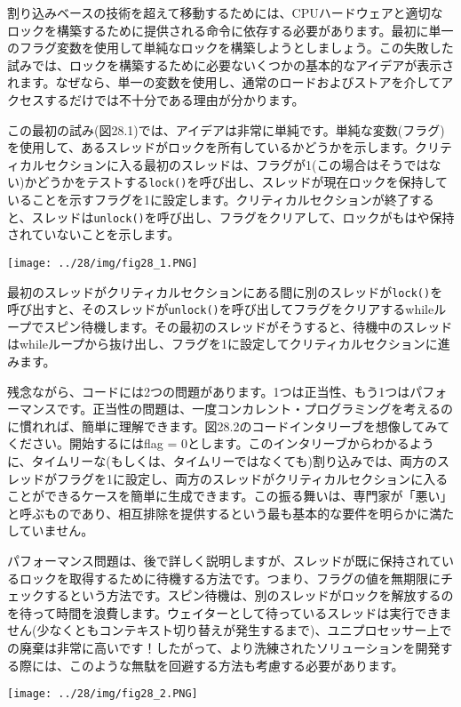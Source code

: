 割り込みベースの技術を超えて移動するためには、CPUハードウェアと適切なロックを構築するために提供される命令に依存する必要があります。最初に単一のフラグ変数を使用して単純なロックを構築しようとしましょう。この失敗した試みでは、ロックを構築するために必要ないくつかの基本的なアイデアが表示されます。なぜなら、単一の変数を使用し、通常のロードおよびストアを介してアクセスするだけでは不十分である理由が分かります。

この最初の試み(図28.1)では、アイデアは非常に単純です。単純な変数(フラグ)を使用して、あるスレッドがロックを所有しているかどうかを示します。クリティカルセクションに入る最初のスレッドは、フラグが1(この場合はそうではない)かどうかをテストする\texttt{lock()}を呼び出し、スレッドが現在ロックを保持していることを示すフラグを1に設定します。クリティカルセクションが終了すると、スレッドは\texttt{unlock()}を呼び出し、フラグをクリアして、ロックがもはや保持されていないことを示します。

\texttt{[image: ../28/img/fig28\_1.PNG]}

最初のスレッドがクリティカルセクションにある間に別のスレッドが\texttt{lock()}を呼び出すと、そのスレッドが\texttt{unlock()}を呼び出してフラグをクリアするwhileループでスピン待機します。その最初のスレッドがそうすると、待機中のスレッドはwhileループから抜け出し、フラグを1に設定してクリティカルセクションに進みます。

残念ながら、コードには2つの問題があります。1つは正当性、もう1つはパフォーマンスです。正当性の問題は、一度コンカレント・プログラミングを考えるのに慣れれば、簡単に理解できます。図28.2のコードインタリーブを想像してみてください。開始するにはflag
=
0とします。このインタリーブからわかるように、タイムリーな(もしくは、タイムリーではなくても)割り込みでは、両方のスレッドがフラグを1に設定し、両方のスレッドがクリティカルセクションに入ることができるケースを簡単に生成できます。この振る舞いは、専門家が「悪い」と呼ぶものであり、相互排除を提供するという最も基本的な要件を明らかに満たしていません。

パフォーマンス問題は、後で詳しく説明しますが、スレッドが既に保持されているロックを取得するために待機する方法です。つまり、フラグの値を無期限にチェックするという方法です。スピン待機は、別のスレッドがロックを解放するのを待って時間を浪費します。ウェイターとして待っているスレッドは実行できません(少なくともコンテキスト切り替えが発生するまで)、ユニプロセッサー上での廃棄は非常に高いです！したがって、より洗練されたソリューションを開発する際には、このような無駄を回避する方法も考慮する必要があります。

\texttt{[image: ../28/img/fig28\_2.PNG]}

